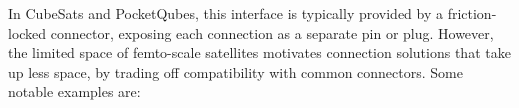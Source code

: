 \documentclass[a4paper,nobib,justified,final]{tufte-book}
\begin{document}
In CubeSats and PocketQubes, this interface is typically provided by a friction-locked connector, exposing each connection as a separate pin or plug. However, the limited space of femto-scale satellites motivates connection solutions that take up less space, by trading off compatibility with common connectors. Some notable examples are:
%
\end{document}
